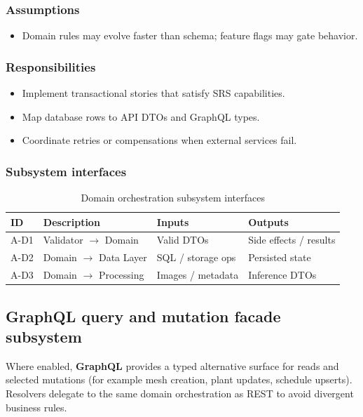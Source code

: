 \subsubsection{Assumptions}
\begin{itemize}
  \item Domain rules may evolve faster than schema; feature flags may gate behavior.
\end{itemize}

\subsubsection{Responsibilities}
\begin{itemize}
  \item Implement transactional stories that satisfy SRS capabilities.
  \item Map database rows to API DTOs and GraphQL types.
  \item Coordinate retries or compensations when external services fail.
\end{itemize}

\subsubsection{Subsystem interfaces}
\begin{table}[H]
\centering
\small
\begin{tabular}{|p{0.9cm}|p{3.4cm}|p{3.0cm}|p{3.5cm}|}
\hline
\textbf{ID} & \textbf{Description} & \textbf{Inputs} & \textbf{Outputs} \\
\hline
A-D1 & Validator $\rightarrow$ Domain & Valid DTOs & Side effects / results \\
\hline
A-D2 & Domain $\rightarrow$ Data Layer & SQL / storage ops & Persisted state \\
\hline
A-D3 & Domain $\rightarrow$ Processing & Images / metadata & Inference DTOs \\
\hline
\end{tabular}
\caption{Domain orchestration subsystem interfaces}
\end{table}

\subsection{GraphQL query and mutation facade subsystem}

Where enabled, \textbf{GraphQL} provides a typed alternative surface for reads and selected mutations (for example mesh creation, plant updates, schedule upserts). Resolvers delegate to the same domain orchestration as REST to avoid divergent business rules.

